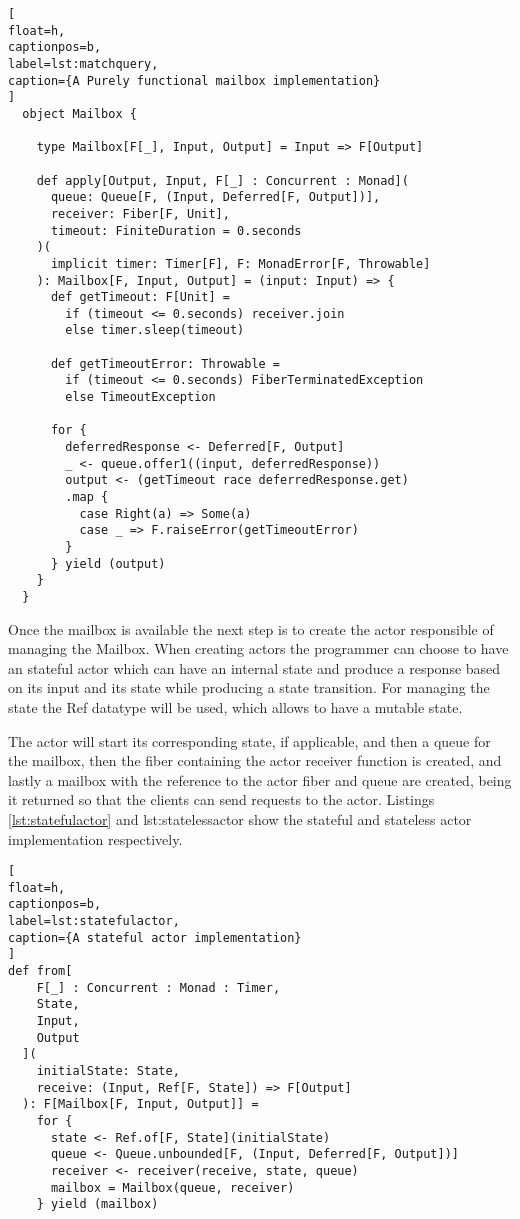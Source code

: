 \documentclass[../main.tex]{subfiles}
\begin{document}
\begin{lstlisting}[
float=h,
captionpos=b,
label=lst:matchquery,
caption={A Purely functional mailbox implementation}
]
  object Mailbox {

    type Mailbox[F[_], Input, Output] = Input => F[Output]

    def apply[Output, Input, F[_] : Concurrent : Monad](
      queue: Queue[F, (Input, Deferred[F, Output])],
      receiver: Fiber[F, Unit],
      timeout: FiniteDuration = 0.seconds
    )(
      implicit timer: Timer[F], F: MonadError[F, Throwable]
    ): Mailbox[F, Input, Output] = (input: Input) => {
      def getTimeout: F[Unit] =
        if (timeout <= 0.seconds) receiver.join
        else timer.sleep(timeout)

      def getTimeoutError: Throwable =
        if (timeout <= 0.seconds) FiberTerminatedException
        else TimeoutException

      for {
        deferredResponse <- Deferred[F, Output]
        _ <- queue.offer1((input, deferredResponse))
        output <- (getTimeout race deferredResponse.get)
        .map {
          case Right(a) => Some(a)
          case _ => F.raiseError(getTimeoutError)
        }
      } yield (output)
    }
  }
\end{lstlisting}

Once the mailbox is available the next step is to create the actor responsible
of managing the Mailbox. When creating actors the programmer can choose to have
an stateful actor which can have an internal state and produce a response based
on its input and its state while producing a state transition. For managing the
state the Ref datatype \autocite{Cats-effectCats.effect.concurrent.Ref} will be
used, which allows to have a mutable state.

The actor will start its corresponding state, if applicable, and then a queue
for the mailbox, then the fiber containing the actor receiver function is
created, and lastly a mailbox with the reference to the actor fiber and queue are
created, being it returned so that the clients can send requests to the actor.
Listings \ref{lst:statefulactor} and {lst:statelessactor} show the
stateful and stateless actor implementation respectively.

\begin{lstlisting}[
float=h,
captionpos=b,
label=lst:statefulactor,
caption={A stateful actor implementation}
]
def from[
    F[_] : Concurrent : Monad : Timer,
    State,
    Input,
    Output
  ](
    initialState: State,
    receive: (Input, Ref[F, State]) => F[Output]
  ): F[Mailbox[F, Input, Output]] =
    for {
      state <- Ref.of[F, State](initialState)
      queue <- Queue.unbounded[F, (Input, Deferred[F, Output])]
      receiver <- receiver(receive, state, queue)
      mailbox = Mailbox(queue, receiver)
    } yield (mailbox)
\end{lstlisting}
\end{document}

